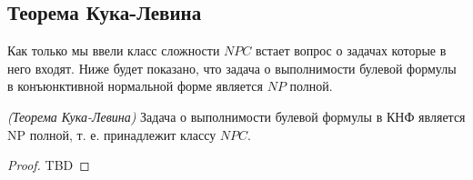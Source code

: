 \subsection{Теорема Кука-Левина}

Как только мы ввели класс сложности $NPC$ встает вопрос о задачах
которые в него входят. Ниже будет показано, что задача о выполнимости
булевой формулы в конъюнктивной нормальной форме является $NP$ полной. 

\begin{theorem}
\emph{(Теорема Кука-Левина)}
Задача о выполнимости булевой формулы в КНФ является NP полной,
т. е. принадлежит классу $NPC$.
\label{theoremAddAlgoCookTheorem}
\end{theorem}

\begin{proof}
TBD
\end{proof}

